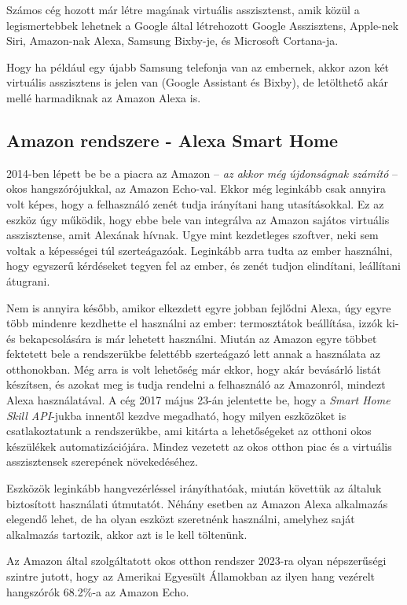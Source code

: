 \documentclass[
]{thesis-ekf}
\theoremstyle{definition}
\theoremstyle{remark}
\begin{document}
	Számos cég hozott már létre magának virtuális asszisztenst, amik közül a legismertebbek lehetnek a Google által létrehozott Google Asszisztens, Apple-nek Siri, Amazon-nak Alexa, Samsung Bixby-je, és Microsoft Cortana-ja.
	
	Hogy ha például egy újabb Samsung telefonja van az embernek, akkor azon két virtuális asszisztens is jelen van (Google Assistant és Bixby), de letölthető akár mellé harmadiknak az Amazon Alexa is.
	
	\subsection{Amazon rendszere - Alexa Smart Home}
	2014-ben lépett be be a piacra az Amazon -- \emph{az akkor még újdonságnak számító} -- okos hangszórójukkal, az Amazon Echo-val. Ekkor még leginkább csak annyira volt képes, hogy a felhasználó zenét tudja irányítani hang utasításokkal. Ez az eszköz úgy működik, hogy ebbe bele van integrálva az Amazon sajátos virtuális asszisztense, amit Alexának hívnak. Ugye mint kezdetleges szoftver, neki sem voltak a képességei túl szerteágazóak. Leginkább arra tudta az ember használni, hogy egyszerű kérdéseket tegyen fel az ember, és zenét tudjon elindítani, leállítani átugrani.
	
	Nem is annyira később, amikor elkezdett egyre jobban fejlődni Alexa, úgy egyre több mindenre kezdhette el használni az ember: termosztátok beállítása, izzók ki- és bekapcsolására is már lehetett használni. Miután az Amazon egyre többet fektetett bele a rendszerükbe felettébb szerteágazó lett annak a használata az otthonokban. Még arra is volt lehetőség már ekkor, hogy akár bevásárló listát készítsen, és azokat meg is tudja rendelni a felhasználó az Amazonról, mindezt Alexa használatával. A cég 2017 május 23-án jelentette be, hogy a \emph{Smart Home Skill API}-jukba\cite{amazon-api} innentől kezdve megadható, hogy milyen eszközöket is csatlakoztatunk a rendszerükbe, ami kitárta a lehetőségeket az otthoni okos készülékek automatizációjára. Mindez vezetett az okos otthon piac és a virtuális asszisztensek szerepének növekedéséhez.
	
	Eszközök leginkább hangvezérléssel irányíthatóak, miután követtük az általuk biztosított használati útmutatót. Néhány esetben az Amazon Alexa alkalmazás elegendő lehet, de ha olyan eszközt szeretnénk használni, amelyhez saját alkalmazás tartozik, akkor azt is le kell töltenünk.
	
	Az Amazon által szolgáltatott okos otthon rendszer 2023-ra olyan népszerűségi szintre jutott, hogy az Amerikai Egyesült Államokban az ilyen hang vezérelt hangszórók 68.2\%-a az Amazon Echo.\cite{amazon-stats}
	
\end{document}
